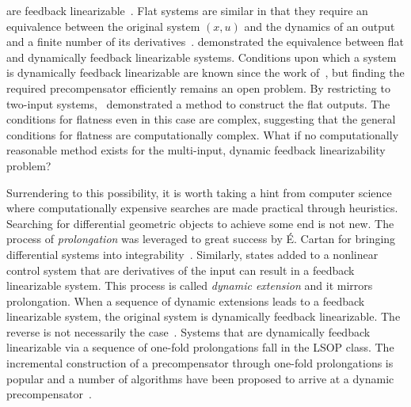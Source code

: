 \documentclass[a4paper]{ifacconf}
\begin{document}
%
are feedback linearizable~\citep{charlet_dynamic_1989}.
Flat systems are similar in that they require an equivalence between the original system \((x, u)\) and the dynamics of an output and a finite number of its derivatives~\citep{levine_analysis_2009}.
\cite{levine_equivalence_2007} demonstrated the equivalence between flat and dynamically feedback linearizable systems.
Conditions upon which a system is dynamically feedback linearizable are known since the work of~\cite{guay_condition_1997}, but finding the required precompensator efficiently remains an open problem.
By restricting to two-input systems,~\cite{gstottner_necessary_2023} demonstrated a method to construct the flat outputs.
The conditions for flatness even in this case are complex, suggesting that the general conditions for flatness are computationally complex.
What if no computationally reasonable method exists for the multi-input, dynamic feedback linearizability problem?

Surrendering to this possibility, it is worth taking a hint from computer science where computationally expensive searches are made practical through heuristics.
Searching for differential geometric objects to achieve some end is not new.
The process of \emph{prolongation} was leveraged to great success by \'E. Cartan for bringing differential systems into integrability~\citep{malgrange_sur_2017, bryant_exterior_1991}.
Similarly, states added to a nonlinear control system that are derivatives of the input can result in a feedback linearizable system.
This process is called \emph{dynamic extension} and it mirrors prolongation.
When a sequence of dynamic extensions leads to a feedback linearizable system, the original system is dynamically feedback linearizable.
The reverse is not necessarily the case~\citep{nicolau_dynamic_2025}.
Systems that are dynamically feedback linearizable via a sequence of one-fold prolongations fall in the LSOP class.
The incremental construction of a precompensator through one-fold prolongations is popular and a number of algorithms have been proposed to arrive at a dynamic precompensator~\citep{battilotti_constructive_2004, astolfi_geometric_2008, levine_differential_2025-1, nicolau_dynamic_2025}.
\end{document}
